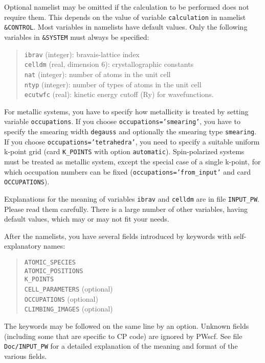 \documentclass[12pt,a4paper]{article}
\begin{document}
Optional namelist may be omitted if the calculation to be performed
does not require them.
This depends on the value of variable \texttt{calculation} in namelist
\texttt{\&CONTROL}.
Most variables in namelists have default values.
Only the following variables in \texttt{\&SYSTEM} must always be
specified:
\begin{quote}
  \texttt{ibrav} (integer): bravais-lattice index\\
  \texttt{celldm} (real, dimension 6): crystallographic constants\\
  \texttt{nat} (integer): number of atoms in the unit cell\\
  \texttt{ntyp} (integer): number of types of atoms in the unit cell\\
  \texttt{ecutwfc} (real): kinetic energy cutoff (Ry) for
    wavefunctions.
\end{quote}
For metallic systems, you have to specify how metallicity
is treated by setting variable \texttt{occupations}. If you choose
\texttt{occupations='smearing'}, you have to specify the 
smearing width \texttt{degauss} and optionally the smearing 
type \texttt{smearing}. If you choose \texttt{occupations='tetrahedra'},
you need to specify a suitable uniform k-point grid (card 
\texttt{K\_POINTS} with option \texttt{automatic}). 
Spin-polarized systems must be treated as metallic system,
except the special case of a single k-point, for which
occupation numbers can be fixed (\texttt{occupations='from\_input'}
and card \texttt{OCCUPATIONS}).

Explanations for the meaning of variables \texttt{ibrav} and
\texttt{celldm} are in file \texttt{INPUT\_PW}.
Please read them carefully.
There is a large number of other variables, having default values,
which may or may not fit your needs.

After the namelists, you have several fields introduced by keywords
with self-explanatory names:

\begin{quote}
  \texttt{ATOMIC\_SPECIES}\\
  \texttt{ATOMIC\_POSITIONS}\\
  \texttt{K\_POINTS}\\
  \texttt{CELL\_PARAMETERS} (optional)\\
  \texttt{OCCUPATIONS} (optional) \\
  \texttt{CLIMBING\_IMAGES} (optional)
\end{quote}

The keywords may be followed on the same line by an option.
Unknown fields (including some that are specific to CP code)
are ignored by PWscf.
See file \texttt{Doc/INPUT\_PW} for a detailed explanation of the
meaning and format of the various fields.
\end{document}
